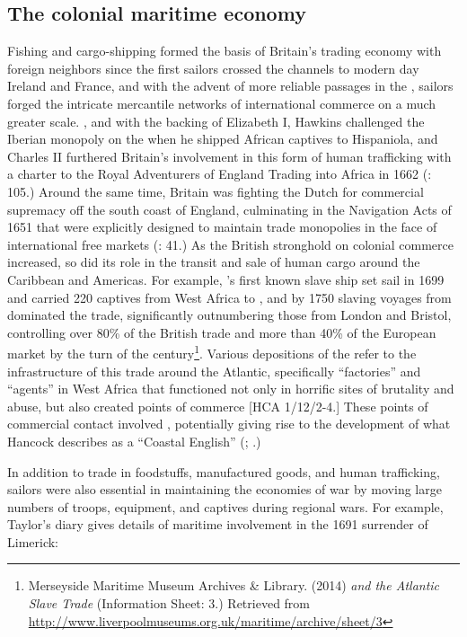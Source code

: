 \subsection{{The colonial maritime economy}}%
\largerpage
  Fishing and cargo-shipping formed the basis of Britain’s trading economy with foreign neighbors since the first sailors crossed the channels to modern day Ireland and France, and with the advent of more reliable  passages in the , sailors forged the intricate mercantile networks of international commerce on a much greater scale. \citealt{In1562}, and with the backing of Elizabeth I, Hawkins challenged the Iberian monopoly on the  when he shipped African captives to Hispaniola, and Charles II furthered Britain’s involvement in this form of human trafficking with a charter to the Royal Adventurers of England Trading into Africa in 1662 (\citealt{Brown2011}: 105.) Around the same time, Britain was fighting the Dutch for commercial supremacy off the south coast of England, culminating in the Navigation Acts of 1651 that were explicitly designed to maintain trade monopolies in the face of international free markets (\citealt{Brown2011}: 41.) As the British stronghold on colonial commerce increased, so did its role in the transit and sale of human cargo around the Caribbean and Americas. For example, ’s first known slave ship set sail in 1699 and carried 220 captives from West Africa to , and by 1750 slaving voyages from  dominated the trade, significantly outnumbering those from London and Bristol, controlling over 80\% of the British trade and more than 40\% of the European market by the turn of the century\footnote{Merseyside Maritime Museum Archives \& Library. (2014) \textit{ and the Atlantic Slave Trade} (Information Sheet: 3.) Retrieved from \url{http://www.liverpoolmuseums.org.uk/maritime/archive/sheet/3}}. 
  Various depositions of the  refer to the infrastructure of this trade around the Atlantic, specifically “factories” and “agents” in West Africa that functioned not only in horrific sites of brutality and abuse, but also created points of commerce [HCA 1/12/2-4.] These points of commercial contact involved , potentially giving rise to the development of what Hancock describes as a “Coastal English” (\citealt{Hancock1986}; \citealt{DelgadoHancock2017}.)

In addition to trade in foodstuffs, manufactured goods, and human trafficking, sailors were also essential in maintaining the economies of war by moving large numbers of troops, equipment, and captives during regional wars. For example, Taylor’s diary gives details of maritime involvement in the 1691 surrender of Limerick:

